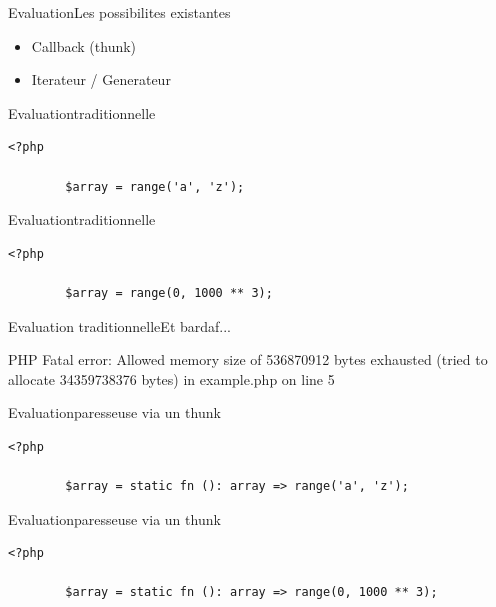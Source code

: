 \begin{frame}{Evaluation}{Les possibilites existantes}
    \begin{itemize}[<+->]
        \item Callback (thunk)
        \item Iterateur / Generateur
    \end{itemize}
\end{frame}

\begin{frame}[fragile]{Evaluation}{traditionnelle}
    \begin{lstlisting}[firstnumber=1]
        <?php

        $array = range('a', 'z');
    \end{lstlisting}
\end{frame}

\begin{frame}[fragile]{Evaluation}{traditionnelle}
    \begin{lstlisting}[firstnumber=1]
        <?php

        $array = range(0, 1000 ** 3);
    \end{lstlisting}
\end{frame}

\begin{frame}[fragile]{Evaluation traditionnelle}{Et bardaf...}
    \begin{spverbatim}
        PHP Fatal error: Allowed memory size of 536870912 bytes exhausted (tried to allocate 34359738376 bytes) in example.php on line 5
    \end{spverbatim}
\end{frame}

\begin{frame}[fragile]{Evaluation}{paresseuse via un thunk}
    \begin{lstlisting}[firstnumber=1]
        <?php

        $array = static fn (): array => range('a', 'z');
    \end{lstlisting}
\end{frame}

\begin{frame}[fragile]{Evaluation}{paresseuse via un thunk}
    \begin{lstlisting}[firstnumber=1]
        <?php

        $array = static fn (): array => range(0, 1000 ** 3);
    \end{lstlisting}
\end{frame}

